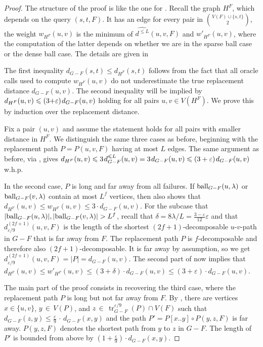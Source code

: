 \documentclass{article}\usepackage[a4paper,margin=20mm]{geometry}
\DeclareMathOperator{\tr}{tr}
\newcommand*{\length}[1]{|#1|}
\newcommand*{\ball}{\mbox{\rm ball}}
\newcommand*{\nwspace}{\hspace*{.1em}}
\renewcommand{\le}{\leqslant}
\newcommand{\eps}{\varepsilon}
\begin{document}
\begin{proof}
	The structure of the proof is like the one for .
	Recall the graph $H^F$, which depends on the query $(s,t,F)$.
	It has an edge for every pair in $\binom{V(F) \cup \{s,t\}}{2}$,
	  the weight $w_{H^F}(u,v)$ is the minimum of $\widehat{d^{\le L}}(u,v,F)$
	and $w'_{H^F}(u,v)$, where the computation of the latter depends on whether
	we are in the sparse ball case or the dense ball case.
	The details are given in 
	
	The first inequality $d_{G-F}(s,t) \le d_{H^F}(s,t)$ follows from the fact that all oracle calls used to compute $w_{H^F}(u,v)$ do not underestimate
	the true replacement distance $d_{G-F}(u,v)$.
%	
	The second inequality will be implied by $d_{H^F}(u,v) \le (3{+}\eps) \nwspace d_{G-F}(u,v)$
	holding for all pairs $u,v \in V(H^F)$.
    We prove this by induction over the replacement distance.
 
    Fix a pair $(u,v)$ 
    and assume the statement holds for all pairs with smaller distance in $H^F$.
	We distinguish the same three cases as before,
 	beginning with the replacement path $P = P(u,v,F)$ having at most $L$ edges.
 	The same argument as before, via , gives
    $d_{H^F}(u,v) \le 3 \nwspace d_{G-F}^{\le L}(u,v) = 3 \nwspace d_{G-F}(u,v) 
    	\le (3+\varepsilon) \nwspace d_{G-F}(u,v)$ w.h.p.

	In the second case, $P$ is long and far away from all failures.
	If $\ball_{G-F}(u,\lambda)$ or $\ball_{G-F}(v,\lambda)$ contain at most $L^f$ vertices,
	then  also shows that
	$d_{H^F}(u,v) \le w_{H^F}(u,v) \le 3 \cdot d_{G-F}(u,v)$.
	For the subcase that $|\ball_{G-F}(u,\lambda)|, |\ball_{G-F}(v,\lambda)| > L^f$,
	recall that $\delta = 8\lambda/L = \frac{3-\varepsilon}{12} \varepsilon$
	and that $d_{\varepsilon/9}^{(2f+1)}(u,v,F)$ is the length of the shortest $(2f{+}1)$-decomposable
	$u$-$v$-path in $G-F$ that is far away from $F$.
	The replacement path $P$ is $f$-decomposable and therefore also $(2f{+}1)$-decomposable.
	It is far away by assumption, so we get
	$d_{\varepsilon/9}^{(2f+1)}(u,v,F) = \length{P} = d_{G-F}(u,v)$.
	The second part of  now implies that
	$d_{H^F}(u,v) \le w'_{H^F}(u,v) \le (3+\delta) \cdot d_{G-F}(u,v) 
		\le (3+\varepsilon) \cdot d_{G-F}(u,v)$.
  
	The main part of the proof consists in recovering the third case,
	where the replacement path $P$ is long but not far away from $F$.
	By , there are vertices $x \in \{u,v\}$, $y \,{\in}\, V(P)$,
	and $z \,{\in}\, \tr^{\eps/9}_{G-F}(P) \cap V(F)$
	such that $d_{G-F}(z,y) \le \tfrac{\eps}{9} \,{\cdot}\, d_{G-F}(x,y)$
	and the path $P' = P[x..y] \circ P(y,z,F)$ is far away.
	$P(y,z,F)$ denotes the shortest path from $y$ to $z$ in $G-F$.
  	The length of $P'$ is bounded from above by \mbox{$(1+ \tfrac{\eps}{9}) \cdot d_{G-F}(x,y)$}.


\end{proof}
\end{document}
